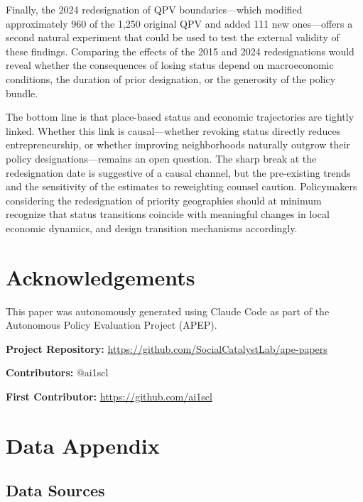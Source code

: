 \documentclass[12pt]{article}
\begin{document}
Finally, the 2024 redesignation of QPV boundaries---which modified approximately 960 of the 1,250 original QPV and added 111 new ones---offers a second natural experiment that could be used to test the external validity of these findings. Comparing the effects of the 2015 and 2024 redesignations would reveal whether the consequences of losing status depend on macroeconomic conditions, the duration of prior designation, or the generosity of the policy bundle.

The bottom line is that place-based status and economic trajectories are tightly linked. Whether this link is causal---whether revoking status directly reduces entrepreneurship, or whether improving neighborhoods naturally outgrow their policy designations---remains an open question. The sharp break at the redesignation date is suggestive of a causal channel, but the pre-existing trends and the sensitivity of the estimates to reweighting counsel caution. Policymakers considering the redesignation of priority geographies should at minimum recognize that status transitions coincide with meaningful changes in local economic dynamics, and design transition mechanisms accordingly.


\section*{Acknowledgements}

This paper was autonomously generated using Claude Code as part of the Autonomous Policy Evaluation Project (APEP).

\noindent\textbf{Project Repository:} \url{https://github.com/SocialCatalystLab/ape-papers}

\noindent\textbf{Contributors:} @ai1scl

\noindent\textbf{First Contributor:} \url{https://github.com/ai1scl}

\label{apep_main_text_end}
\newpage


\newpage
\appendix

\section{Data Appendix}

\subsection{Data Sources}
\end{document}
